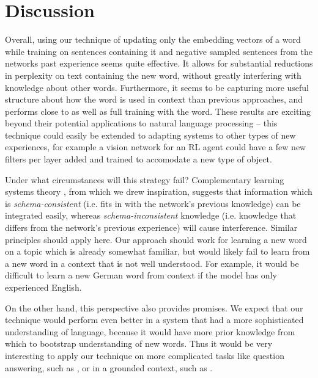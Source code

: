 \documentclass{article}
\begin{document}
\section{Discussion}
Overall, using our technique of updating only the embedding vectors of a word while training on sentences containing it and negative sampled sentences from the networks past experience seems quite effective. It allows for substantial reductions in perplexity on text containing the new word, without greatly interfering with knowledge about other words. Furthermore, it seems to be capturing more useful structure about how the word is used in context than previous approaches, and performs close to as well as full training with the word. These results are exciting beyond their potential applications to natural language processing -- this technique could easily be extended to adapting systems to other types of new experiences, for example a vision network for an RL agent could have a few new filters per layer added and trained to accomodate a new type of object. \par 
Under what circumstances will this strategy fail? Complementary learning systems theory \citep{Kumaran2016}, from which we drew inspiration, suggests that information which is \emph{schema-consistent} (i.e. fits in with the network's previous knowledge) can be integrated easily, whereas \emph{schema-inconsistent} knowledge (i.e. knowledge that differs from the network's previous experience) will cause interference. Similar principles should apply here. Our approach should work for learning a new word on a topic which is already somewhat familiar, but would likely fail to learn from a new word in a context that is not well understood. For example, it would be difficult to learn a new German word from context if the model has only experienced English. \par  
On the other hand, this perspective also provides promises. We expect that our technique would perform even better in a system that had a more sophisticated understanding of language, because it would have more prior knowledge from which to bootstrap understanding of new words. Thus it would be very interesting to apply our technique on more complicated tasks like question answering, such as \citet{Santoro2017}, or in a grounded context, such as \citet{Hermann2017}. \par 
\end{document}
